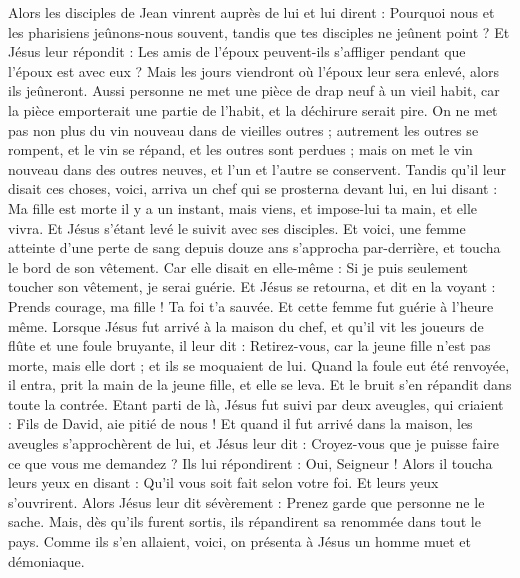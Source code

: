 \begin{multicols}{2}
Alors les disciples de Jean vinrent auprès de lui et lui dirent : Pourquoi nous et les pharisiens jeûnons-nous souvent, tandis que tes disciples ne jeûnent point ?
Et Jésus leur répondit : Les amis de l’époux peuvent-ils s'affliger pendant que l’époux est avec eux ? Mais les jours viendront où l’époux leur sera enlevé, alors ils jeûneront.
Aussi personne ne met une pièce de drap neuf à un vieil habit, car la pièce emporterait une partie de l’habit, et la déchirure serait pire.
On ne met pas non plus du vin nouveau dans de vieilles outres ; autrement les outres se rompent, et le vin se répand, et les outres sont perdues ; mais on met le vin nouveau dans des outres neuves, et l'un et l'autre se conservent.
Tandis qu’il leur disait ces choses, voici, arriva un chef qui se prosterna devant lui, en lui disant : Ma fille est morte il y a un instant, mais viens, et impose-lui ta main, et elle vivra.
Et Jésus s'étant levé le suivit avec ses disciples.
Et voici, une femme atteinte d'une perte de sang depuis douze ans s’approcha par-derrière, et toucha le bord de son vêtement.
Car elle disait en elle-même : Si je puis seulement toucher son vêtement, je serai guérie.
Et Jésus se retourna, et dit en la voyant : Prends courage, ma fille ! Ta foi t'a sauvée. Et cette femme fut guérie à l’heure même.
Lorsque Jésus fut arrivé à la maison du chef, et qu'il vit les joueurs de flûte et une foule bruyante,
il leur dit : Retirez-vous, car la jeune fille n'est pas morte, mais elle dort ; et ils se moquaient de lui.
Quand la foule eut été renvoyée, il entra, prit la main de la jeune fille, et elle se leva.
Et le bruit s'en répandit dans toute la contrée.
Etant parti de là, Jésus fut suivi par deux aveugles, qui criaient : Fils de David, aie pitié de nous !
Et quand il fut arrivé dans la maison, les aveugles s’approchèrent de lui, et Jésus leur dit : Croyez-vous que je puisse faire ce que vous me demandez ? Ils lui répondirent : Oui, Seigneur !
Alors il toucha leurs yeux en disant : Qu'il vous soit fait selon votre foi.
Et leurs yeux s’ouvrirent. Alors Jésus leur dit sévèrement : Prenez garde que personne ne le sache.
Mais, dès qu’ils furent sortis, ils répandirent sa renommée dans tout le pays.
Comme ils s’en allaient, voici, on présenta à Jésus un homme muet et démoniaque.

\end{multicols}

